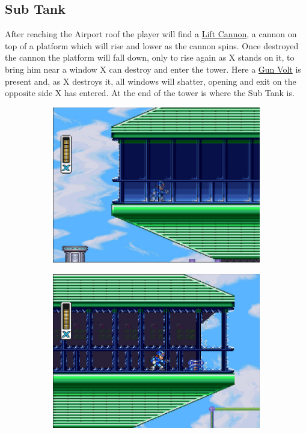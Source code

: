 \subsection{Sub Tank}
After reaching the Airport roof the player will find a 	\hyperlink{enem:Lift_cannon}{Lift Cannon}, a cannon on top of a platform which will rise and lower as the cannon spins. Once destroyed the cannon the platform will fall down, only to rise again as X stands on it, to bring him near a window X can destroy and enter the tower. Here a \hyperlink{enem:Gun_Volt}{Gun Volt} is present and, as X destroys it, all windows will shatter, opening and exit on the opposite side X has entered. At the end of the tower is where the Sub Tank is. 
 
 \begin{figure}[h]
 	\centering
 	\begin{subfigure}{0.4\linewidth}
 		\centering
 		\includegraphics[width=\linewidth]{figures/X1/Storm_tank_1.jpg}
 		\caption{}
 	\end{subfigure}
 	\begin{subfigure}{0.4\linewidth}
 		\centering
 		\includegraphics[width=\linewidth]{figures/X1/Storm_tank_2.jpg}

\end{subfigure}
\end{figure}
